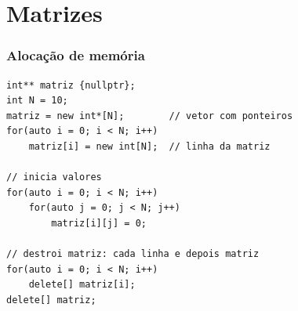 \documentclass[xcolor={usenames,dvipsnames},12pt,presentation,aspectratio=169]{beamer}
\begin{document}
\section{Matrizes}

\begin{frame}[fragile]
  \frametitle{Alocação de memória}
  \vspace{-4mm}
  \begin{block}{}
\begin{lstlisting}
int** matriz {nullptr};
int N = 10;
matriz = new int*[N];        // vetor com ponteiros
for(auto i = 0; i < N; i++)
    matriz[i] = new int[N];  // linha da matriz

// inicia valores
for(auto i = 0; i < N; i++)
    for(auto j = 0; j < N; j++)
        matriz[i][j] = 0;

// destroi matriz: cada linha e depois matriz
for(auto i = 0; i < N; i++)
    delete[] matriz[i];
delete[] matriz;
\end{lstlisting}
\end{block}
\end{frame}
\end{document}
